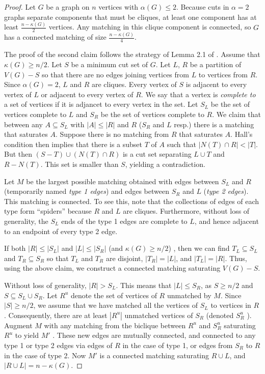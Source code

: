 \begin{proof} Let $G$ be a graph on $n$ vertices with $\alpha(G) \leq 2$.  Because cuts in $\alpha = 2$ graphs separate components that must be cliques, at least one component has at least $\frac{n-\kappa(G)}{2}$ vertices.  Any matching in this clique component is connected, so $G$ has a connected matching of size $\frac{n-\kappa(G)}{4}$. 

The proof of the second claim follows the strategy of Lemma 2.1 of \cite{Blas}. 
%
Assume that $\kappa(G) \geq n/2$.
%
Let $S$ be a minimum cut set of $G$. 
%
Let $L$, $R$ be a partition of $V(G)-S$ so that there are no edges joining vertices from $L$ to vertices from $R$. 
%
Since $\alpha(G) = 2$, $L$ and $R$ are cliques.  Every vertex of $S$ is adjacent to every vertex of $L$ or adjacent to every vertex of $R$.
%
We say that a vertex is {\it complete to} a set of vertices if it is adjancet to every vertex in the set.
%
Let $S_L$ be the set of vertices complete to $L$ and $S_R$ be the set of vertices complete to $R$. 
%
We claim that between any $A \subseteq S_L$ with $|A| \leq |R|$ and $R$ ($S_R$ and $L$ resp.) there is a matching that saturates $A$. 
%
Suppose there is no matching from $R$ that saturates $A$. 
%
Hall’s condition then implies that there is a subset $T$ of $A$ such that $|N(T) \cap R| < |T |$. 
%
But then $(S -T) \cup (N(T)\cap R)$ is a cut set separating $L \cup T$ and $R - N (T)$. 
%
This set is smaller than $S$, yielding a contradiction.

Let $M$ be the largest possible matching obtained with edges between $S_L$ and $R$ (temporarily named {\it type 1 edges}) and edges between $S_R$ and $L$ ({\it type 2 edges}). 
%
This matching is connected.
%
To see this, note that the collections of edges of each type form ``spiders'' because $R$ and $L$ are cliques.
%
Furthermore, without loss of generality, the $S_L$ ends of the type 1 edges are complete to $L$, and hence adjacent to an endpoint of every type 2 edge.
%

If both $|R| \leq |S_L|$ and $|L| \leq |S_R|$ (and $\kappa(G) \geq n/2$) , then we can find $T_L \subseteq S_L$ and $T_R \subseteq S_R$ so that $T_L$ and $T_R$ are disjoint, $|T_R| = |L|$, and $|T_L| = |R|$. 
%
Thus, using the above claim, we construct a connected matching saturating $V(G)-S$.  
%

Without loss of generality, $|R| > S_L$.
%
This means that $|L| \leq S_R$, as $S \geq n/2$ and $S \subseteq S_L \cup S_R$.
%
Let $R^u$ denote the set of vertices of $R$ unmatched by $M$.
%
Since $|S| \geq n/2$, we assume that we have matched all the vertices of $S_L$ to vertices in $R$.  
%
Consequently, there are at least $|R^u|$ unmatched vertices of $S_R$ (denoted $S_R^u$ ).
%
 Augment $M$ with any matching from the biclique between $R^u$ and $S_R^u$ saturating $R^u$ to yield $M'$ . 
%
These new edges are mutually connected, and connected to any type 1 or type 2 edges via edges of $R$ in the case of type 1, or edges from $S_R$ to $R$ in the case of type 2. 
%
Now $M'$ is a connected matching saturating $R \cup L$, and $|R \cup L| = n- \kappa(G)$.
\end{proof}

